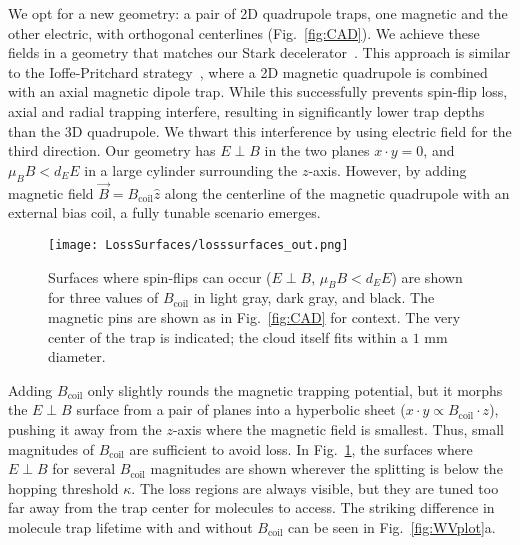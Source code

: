 \documentclass[%
 reprint,
 amsmath,amssymb,
 aps,
prl,
]{revtex4-1}
\newcommand{\bcl}{{$B_\text{coil}$}}
\newcommand{\epb}{{$E\!\perp\!B$}}
\begin{document}
We opt for a new geometry: a pair of 2D quadrupole traps, one magnetic and the other electric, with orthogonal centerlines (Fig.~\ref{fig:CAD}). We achieve these fields in a geometry that matches our Stark decelerator~\cite{Bochinski2003}. This approach is similar to the Ioffe-Pritchard strategy~\cite{pritchard1983}, where a 2D magnetic quadrupole is combined with an axial magnetic dipole trap. While this successfully prevents spin-flip loss, axial and radial trapping interfere, resulting in significantly lower trap depths than the 3D quadrupole. We thwart this interference by using electric field for the third direction. Our geometry has \epb{} in the two planes $x\cdot y=0$, and $\mu_BB < d_EE$ in a large cylinder surrounding the $z$-axis. However, by adding magnetic field $\vec{B}=B_\text{coil}\hat{z}$ along the centerline of the magnetic quadrupole with an external bias coil, a fully tunable scenario emerges. %


\begin{figure}[tb]
\texttt{[image: LossSurfaces/losssurfaces\_out.png]}%
\caption{
Surfaces where spin-flips can occur (\epb{}, $\mu_BB<d_EE$) are shown for three values of \bcl{} in light gray, dark gray, and black. The magnetic pins are shown as in Fig.~\ref{fig:CAD} for context. The very center of the trap is indicated; the cloud itself fits within a \raisebox{2.5px}{\texttildelow} $\!\!1\text{ mm}$ diameter.
\label{fig:LSurfs}}
\end{figure}

Adding \bcl{} only slightly rounds the magnetic trapping potential, but it morphs the \epb{} surface from a pair of planes into a hyperbolic sheet ($x\cdot y\propto B_\text{coil}\cdot z$), pushing it away from the $z$-axis where the magnetic field is smallest. Thus, small magnitudes of \bcl{} are sufficient to avoid loss. In Fig.~\ref{fig:LSurfs}, the surfaces where \epb{} for several \bcl{} magnitudes are shown wherever the splitting is below the hopping threshold $\kappa$. The loss regions are always visible, but they are tuned too far away from the trap center for molecules to access. The striking difference in molecule trap lifetime with and without \bcl{} can be seen in Fig.~\ref{fig:WVplot}a.
\end{document}
